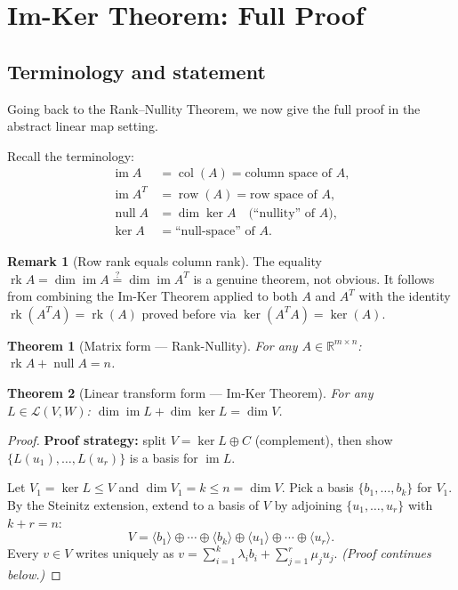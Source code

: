 \documentclass[11pt]{article}
\theoremstyle{definition}
\newtheorem{remark}{Remark}[section]
\theoremstyle{plain}
\newtheorem{theorem}{Theorem}[section]
\begin{document}
\section{Im-Ker Theorem: Full Proof}

\subsection{Terminology and statement}

Going back to the Rank--Nullity Theorem, we now give the full
proof in the abstract linear map setting.

\medskip\noindent
Recall the terminology:
\begin{align*}
  \operatorname{im}A &= \operatorname{col}(A) = \text{column space of }A,\\
  \operatorname{im}A^T &= \operatorname{row}(A) = \text{row space of }A,\\
  \operatorname{null}A &= \dim\ker A \quad\text{(``nullity'' of }A),\\
  \ker A &= \text{``null-space'' of }A.
\end{align*}

\begin{remark}[Row rank equals column rank]
  The equality $\operatorname{rk}A = \dim\operatorname{im}A
  \stackrel{?}{=} \dim\operatorname{im}A^T$ is a genuine theorem, not
  obvious.  It follows from combining the Im-Ker Theorem applied to both
  $A$ and $A^T$ with the identity $\operatorname{rk}(A^TA) = \operatorname{rk}(A)$ proved before via $\ker(A^TA) = \ker(A)$.
\end{remark}

\begin{theorem}[Matrix form --- Rank-Nullity]
  For any $A \in \mathbb{R}^{m \times n}$:
  $\operatorname{rk}A + \operatorname{null}A = n$.
\end{theorem}

\begin{theorem}[Linear transform form --- Im-Ker Theorem]
  For any $L \in \mathcal{L}(V, W)$:
  $\dim\operatorname{im}L + \dim\ker L = \dim V$.
\end{theorem}

\begin{proof}
  \textbf{Proof strategy:} split $V = \ker L \oplus C$ (complement),
  then show $\{L(u_1),\ldots,L(u_r)\}$ is a basis for $\operatorname{im}L$.

  Let $V_1 = \ker L \leq V$ and $\dim V_1 = k \leq n = \dim V$.
  Pick a basis $\{b_1,\ldots,b_k\}$ for $V_1$.
  By the Steinitz extension, extend to a basis of $V$
  by adjoining $\{u_1,\ldots,u_r\}$ with $k + r = n$:
  \[
    V = \langle b_1\rangle\oplus\cdots\oplus\langle b_k\rangle
        \oplus\langle u_1\rangle\oplus\cdots\oplus\langle u_r\rangle.
  \]
  Every $v \in V$ writes uniquely as
  $v = \sum_{i=1}^k \lambda_i b_i + \sum_{j=1}^r \mu_j u_j$.
  \emph{(Proof continues below.)}
\end{proof}
\end{document}
